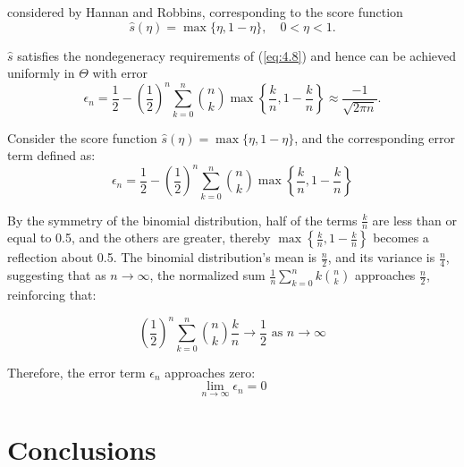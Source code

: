 \documentclass[11pt]{article}
\numberwithin{equation}{section}
\theoremstyle{boldStyle}
\begin{document}
considered by Hannan and Robbins, corresponding to the score function
\begin{equation} \label{eq:4.13}
    \hat{s}(\eta) = \max \{\eta, 1 - \eta\}, \quad 0 < \eta < 1.
\end{equation}

$\hat{s}$ satisfies the nondegeneracy requirements of (\ref{eq:4.8}) and hence can be achieved uniformly in $\Theta$ with error
\[
    \epsilon_n =  \frac{1}{2} - \left(\frac{1}{2}\right)^n \sum_{k=0}^n \binom{n}{k} \max \left\{ \frac{k}{n}, 1 - \frac{k}{n} \right\} \approx \frac{-1}{\sqrt{2\pi n}}.
\]


Consider the score function $\hat{s}(\eta) = \max\{\eta, 1-\eta\}$, and the corresponding error term defined as:
\[
\epsilon_n = \frac{1}{2} - \left(\frac{1}{2}\right)^n \sum_{k=0}^n \binom{n}{k} \max\left\{\frac{k}{n}, 1 - \frac{k}{n}\right\}
\]

By the symmetry of the binomial distribution, half of the terms $\frac{k}{n}$ are less than or equal to 0.5, and the others are greater, thereby $\max\left\{\frac{k}{n}, 1 - \frac{k}{n}\right\}$ becomes a reflection about 0.5. The binomial distribution's mean is $\frac{n}{2}$, and its variance is $\frac{n}{4}$, suggesting that as $n \rightarrow \infty$, the normalized sum $\frac{1}{n} \sum_{k=0}^n k \binom{n}{k}$ approaches $\frac{n}{2}$, reinforcing that:

\[
\left(\frac{1}{2}\right)^n \sum_{k=0}^n \binom{n}{k} \frac{k}{n} \rightarrow \frac{1}{2} \text{ as } n \rightarrow \infty
\]

Therefore, the error term $\epsilon_n$ approaches zero:
\[
\lim_{n \to \infty} \epsilon_n = 0
\]





\newpage


\section{Conclusions}
\end{document}
